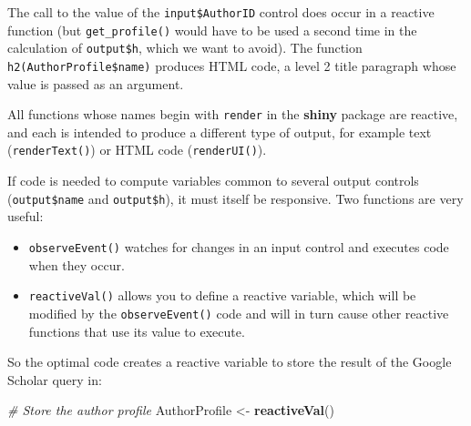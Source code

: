 \documentclass[
  12pt,
  american,
  a4paper,
  extrafontsizes,onecolumn,openright
  ]{memoir}
\newenvironment{Shaded}{\begin{snugshade}}{\end{snugshade}}
\newcommand{\CommentTok}[1]{\textcolor[rgb]{0.56,0.35,0.01}{\textit{#1}}}
\newcommand{\FunctionTok}[1]{\textcolor[rgb]{0.13,0.29,0.53}{\textbf{#1}}}
\newcommand{\NormalTok}[1]{#1}
\newcommand{\OtherTok}[1]{\textcolor[rgb]{0.56,0.35,0.01}{#1}}
\newcommand{\SpecialCharTok}[1]{\textcolor[rgb]{0.81,0.36,0.00}{\textbf{#1}}}
\providecommand{\tightlist}{%
  \setlength{\itemsep}{0pt}\setlength{\parskip}{0pt}}
\begin{document}
\begin{Shaded}
\end{Shaded}

\normalsize

The call to the value of the \texttt{input\$AuthorID} control does occur in a reactive function (but \texttt{get\_profile()} would have to be used a second time in the calculation of \texttt{output\$h}, which we want to avoid).
The function \texttt{h2(AuthorProfile\$name)} produces HTML code, a level 2 title paragraph whose value is passed as an argument.

All functions whose names begin with \texttt{render} in the \textbf{shiny} package are reactive, and each is intended to produce a different type of output, for example text (\texttt{renderText()}) or HTML code (\texttt{renderUI()}).

If code is needed to compute variables common to several output controls (\texttt{output\$name} and \texttt{output\$h}), it must itself be responsive.
Two functions are very useful:

\begin{itemize}
\tightlist
\item
  \texttt{observeEvent()} watches for changes in an input control and executes code when they occur.
\item
  \texttt{reactiveVal()} allows you to define a reactive variable, which will be modified by the \texttt{observeEvent()} code and will in turn cause other reactive functions that use its value to execute.
\end{itemize}

So the optimal code creates a reactive variable to store the result of the Google Scholar query in:

\scriptsize

\begin{Shaded}
\begin{Highlighting}[]
\CommentTok{\# Store the author profile}
\NormalTok{AuthorProfile }\OtherTok{\textless{}{-}} \FunctionTok{reactiveVal}\NormalTok{()}
\end{Highlighting}
\end{Shaded}
\end{document}
